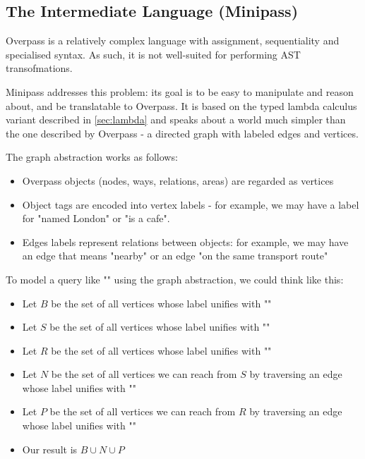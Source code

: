 \documentclass[main.tex]{subfiles}
\begin{document}
\subsection{The Intermediate Language (Minipass)}
\label{sec:minipass}
Overpass is a relatively complex language with assignment, sequentiality
and specialised syntax. As such, it is not well-suited for performing
AST transofmations.

Minipass addresses this problem: its goal is to be easy to manipulate
and reason about, and be translatable to Overpass. It is based on the typed
lambda calculus variant described in \cref{sec:lambda} and speaks about a
world much simpler than the one described by Overpass - a directed graph
with labeled edges and vertices.

The graph abstraction works as follows:
\begin{itemize}
    \item Overpass objects (nodes, ways, relations, areas) are regarded as
        vertices
    \item Object tags are encoded into vertex labels - for example, we
        may have a label for "named London" or "is a cafe".
    \item Edges labels represent relations between objects: for example,
        we may have an edge that means "nearby" or an edge "on the same
        transport route"
\end{itemize}

\begin{example}
    To model a query like ""
    using the graph abstraction, we could think like this:
    \begin{itemize}
        \item Let $B$ be the set of all vertices whose label unifies with
            ""
        \item Let $S$ be the set of all vertices whose label unifies with
            ""
        \item Let $R$ be the set of all vertices whose label unifies with
            ""
        \item Let $N$ be the set of all vertices we can reach from $S$
            by traversing an edge whose label unifies with ""
        \item Let $P$ be the set of all vertices we can reach from $R$
            by traversing an edge whose label unifies with ""
        \item Our result is $B \cup N \cup P$
    \end{itemize}
\end{example}
\end{document}
